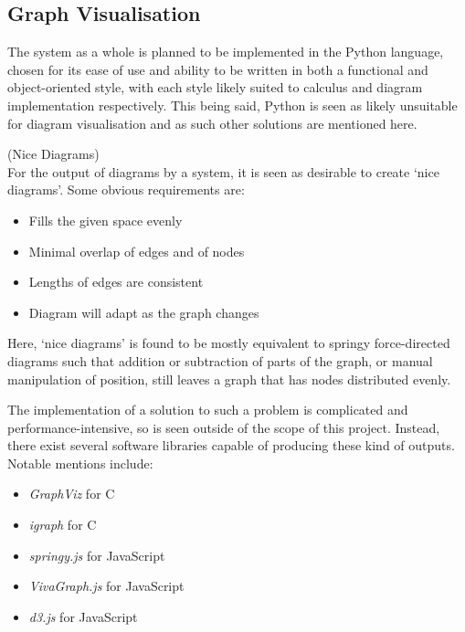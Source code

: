 \subsection{Graph Visualisation}

    The system as a whole is planned to be implemented in the Python language, chosen for its ease of use and ability to be written in both a functional and object-oriented style, with each style likely suited to calculus and diagram implementation respectively.
    This being said, Python is seen as likely unsuitable for diagram visualisation and as such other solutions are mentioned here.\\
    
    \begin{definition*}{(Nice Diagrams)\\}
        For the output of diagrams by a system, it is seen as desirable to create `nice diagrams'.
        Some obvious requirements are:
        \begin{itemize}
            \item Fills the given space evenly
            \item Minimal overlap of edges and of nodes
            \item Lengths of edges are consistent
            \item Diagram will adapt as the graph changes
        \end{itemize}
        Here, `nice diagrams' is found to be mostly equivalent to springy force-directed diagrams such that addition or subtraction of parts of the graph, or manual manipulation of position, still leaves a graph that has nodes distributed evenly.
    \end{definition*}


    \begin{examples}
        The implementation of a solution to such a problem is complicated and performance-intensive, so is seen outside of the scope of this project.
        Instead, there exist several software libraries capable of producing these kind of outputs.
        Notable mentions include:
        \begin{itemize}
            \item \textit{GraphViz} for C~\footnotemark
            \item \textit{igraph} for C~\addtocounter{footnote}{-1}\footnotemark
            \item \textit{springy.js} for JavaScript
            \item \textit{VivaGraph.js} for JavaScript
            \item \textit{d3.js} for JavaScript
        \end{itemize}
    \end{examples}

